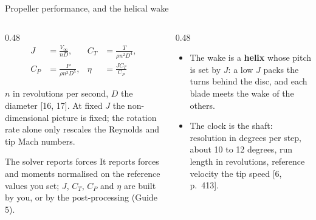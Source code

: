 \begin{frame}{Propeller performance, and the helical wake}
\begin{columns}[T]
\begin{column}{0.48\textwidth}
\begin{align*}
J &= \frac{V_\infty}{nD}, & C_T &= \frac{T}{\rho n^2 D^4}, \\
C_P &= \frac{P}{\rho n^3 D^5}, & \eta &= \frac{J C_T}{C_P}
\end{align*}
{\small \(n\) in revolutions per second, \(D\) the diameter [16, 17]. At
fixed \(J\) the non-dimensional picture is fixed; the rotation rate alone only
rescales the Reynolds and tip Mach numbers.\par}
\vspace{1mm}
\begin{alertblock}{The solver reports forces}
\small It reports forces and moments normalised on the reference values you
set; \(J\), \(C_T\), \(C_P\) and \(\eta\) are built by you, or by the
post-processing (Guide 5).
\end{alertblock}
\end{column}
\begin{column}{0.48\textwidth}
\begin{itemize}\small
  \item The wake is a \textbf{helix} whose pitch is set by \(J\): a low \(J\)
        packs the turns behind the disc, and each blade meets the wake of the
        others.
  \item The clock is the shaft: resolution in degrees per step, about 10 to 12
        degrees, run length in revolutions, reference velocity the tip speed
        [6, p.~413].
\end{itemize}
\end{column}
\end{columns}
\end{frame}
